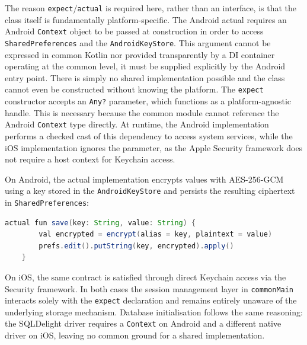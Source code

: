 The reason \texttt{expect}/\texttt{actual} is required here, rather than an interface, is that the class itself is fundamentally platform-specific.
The Android actual requires an Android \texttt{Context} object to be passed at construction in order to access \texttt{SharedPreferences} and the \texttt{AndroidKeyStore}.
This argument cannot be expressed in common Kotlin nor provided transparently by a DI container operating at the common level, it must be supplied explicitly by the Android entry point.
There is simply no shared implementation possible and the class cannot even be constructed without knowing the platform.
The \texttt{expect} constructor accepts an \texttt{Any?} parameter, which functions as a platform-agnostic handle. This is necessary because the common module cannot reference the Android \texttt{Context} type directly. At runtime, the Android implementation performs a checked cast of this dependency to access system services, while the iOS implementation ignores the parameter, as the Apple Security framework does not require a host context for Keychain access.

On Android, the actual implementation encrypts values with AES-256-GCM using a key stored in the \texttt{AndroidKeyStore} and persists the resulting ciphertext in \texttt{SharedPreferences}:

\begin{lstlisting}[language=java, caption={SecureStorage actual — Android save (androidMain)}]
	actual fun save(key: String, value: String) {
		val encrypted = encrypt(alias = key, plaintext = value)
		prefs.edit().putString(key, encrypted).apply()
	}
\end{lstlisting}

On iOS, the same contract is satisfied through direct Keychain access via the Security framework.
In both cases the session management layer in \texttt{commonMain} interacts solely with the \texttt{expect} declaration and remains entirely unaware of the underlying storage mechanism.
Database initialisation follows the same reasoning: the SQLDelight driver requires a \texttt{Context} on Android and a different native driver on iOS, leaving no common ground for a shared implementation.

